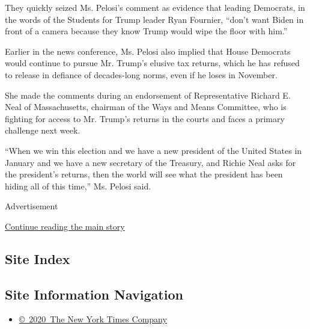 They quickly seized Ms. Pelosi's comment as evidence that leading
Democrats, in the words of the Students for Trump leader Ryan Fournier,
``don't want Biden in front of a camera because they know Trump would
wipe the floor with him.''

Earlier in the news conference, Ms. Pelosi also implied that House
Democrats would continue to pursue Mr. Trump's elusive tax returns,
which he has refused to release in defiance of decades-long norms, even
if he loses in November.

She made the comments during an endorsement of Representative Richard E.
Neal of Massachusetts, chairman of the Ways and Means Committee, who is
fighting for access to Mr. Trump's returns in the courts and faces a
primary challenge next week.

``When we win this election and we have a new president of the United
States in January and we have a new secretary of the Treasury, and
Richie Neal asks for the president's returns, then the world will see
what the president has been hiding all of this time,'' Ms. Pelosi said.

Advertisement

\protect\hyperlink{after-bottom}{Continue reading the main story}

\hypertarget{site-index}{%
\subsection{Site Index}\label{site-index}}

\hypertarget{site-information-navigation}{%
\subsection{Site Information
Navigation}\label{site-information-navigation}}

\begin{itemize}
\tightlist
\item
  \href{https://help.nytimes3xbfgragh.onion/hc/en-us/articles/115014792127-Copyright-notice}{©~2020~The
  New York Times Company}
\end{itemize}

